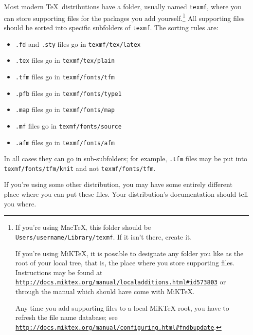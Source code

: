 \documentclass[draft]{amsart}
\begin{document}
Most modern \TeX\ distributions have a folder, usually named
\texttt{texmf}, where you can store supporting files for the packages
you add yourself.\footnote{If you're using Mac\TeX, this folder should
be \texttt{Users\slash username\slash Library\slash texmf}. If it isn't
there, create it.

If you're using MiK\TeX, it is possible to designate any folder you like
as the root of your local tree, that is, the place where you store
supporting files. Instructions may be found at 
\href{http://docs.miktex.org/manual/localadditions.html\#id573803}
{\texttt{http:/\slash docs.miktex.org\slash manual\slash localadditions.html\allowbreak\#id573803}}
or through the manual which should have come with MiKTeX.

Any time you add supporting files to a local MiKTeX root, you have to
refresh the file name database; see 
\href{http://docs.miktex.org/manual/configuring.html\#fndbupdate}
{\texttt{http:/\slash docs.miktex.org\slash manual\slash configuring.html\allowbreak\#fndbupdate}}. } 
All supporting files should be sorted into specific subfolders of
\texttt{texmf}. The sorting rules are:
\begin{itemize}
\item \texttt{.fd} and \texttt{.sty} files go in \verb.texmf/tex/latex.
\item \texttt{.tex} files go in  \verb.texmf/tex/plain.
\item \texttt{.tfm} files go in \verb.texmf/fonts/tfm.
\item \texttt{.pfb} files go in \verb.texmf/fonts/type1.
\item \texttt{.map} files go in \verb.texmf/fonts/map.
\item \texttt{.mf} files go in \verb.texmf/fonts/source.
\item \texttt{.afm} files go in \verb.texmf/fonts/afm.
\end{itemize}
In all cases they can go in sub-subfolders; for example, \texttt{.tfm}
files may be put into \texttt{texmf/fonts\slash tfm/knit} and not
\texttt{texmf/fonts/tfm}.

If you're using some other distribution, you may have some entirely
different place where you can put these files. Your distribution's
documentation should tell you where.
\end{document}

